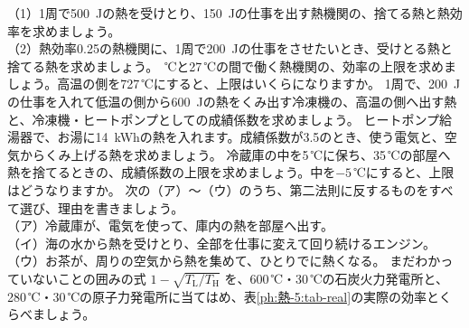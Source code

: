 \bkendproblems
{}%
\bkproblem （1）1周で\qty{500}{J}の熱を受けとり、\qty{150}{J}の仕事を出す熱機関の、捨てる熱と熱効率を求めましょう。\\
（2）熱効率0.25の熱機関に、1周で\qty{200}{J}の仕事をさせたいとき、受けとる熱と捨てる熱を求めましょう。
\,℃と27\,℃の間で働く熱機関の、効率の上限を求めましょう。高温の側を727\,℃にすると、上限はいくらになりますか。
\bkproblem 1周で、\qty{200}{J}の仕事を入れて低温の側から\qty{600}{J}の熱をくみ出す冷凍機の、高温の側へ出す熱と、冷凍機・ヒートポンプとしての成績係数を求めましょう。
\bkproblem ヒートポンプ給湯器で、お湯に\qty{14}{kWh}の熱を入れます。成績係数が3.5のとき、使う電気と、空気からくみ上げる熱を求めましょう。
\bkproblem 冷蔵庫の中を5\,℃に保ち、35\,℃の部屋へ熱を捨てるときの、成績係数の上限を求めましょう。中を$-5$\,℃にすると、上限はどうなりますか。
\bkproblem 次の（ア）〜（ウ）のうち、第二法則に反するものをすべて選び、理由を書きましょう。\\
（ア）冷蔵庫が、電気を使って、庫内の熱を部屋へ出す。\\
（イ）海の水から熱を受けとり、全部を仕事に変えて回り続けるエンジン。\\
（ウ）お茶が、周りの空気から熱を集めて、ひとりでに熱くなる。
\bkproblem まだわかっていないことの囲みの式 $1-\sqrt{T_{\mathrm L}/T_{\mathrm H}}$ を、600\,℃・30\,℃の石炭火力発電所と、280\,℃・30\,℃の原子力発電所に当てはめ、表\ref{ph:熱-5:tab-real}の実際の効率とくらべましょう。
